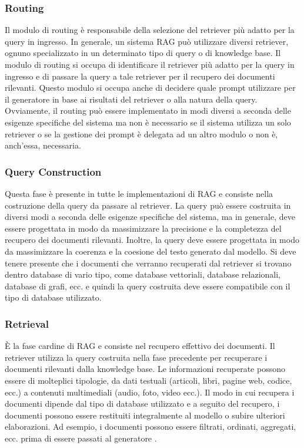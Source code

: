 \subsubsection{Routing}
Il modulo di routing è responsabile della selezione del retriever più adatto per la query in ingresso. In generale, un sistema RAG può utilizzare diversi retriever, ognuno specializzato in un determinato tipo di query o di knowledge base. Il modulo di routing si occupa di identificare il retriever più adatto per la query in ingresso e di passare la query a tale retriever per il recupero dei documenti rilevanti. Questo modulo si occupa anche di decidere quale prompt utilizzare per il generatore in base ai risultati del retriever o alla natura della query. Ovviamente, il routing può essere implementato in modi diversi a seconda delle esigenze specifiche del sistema ma non è necessario se il sistema utilizza un solo retriever o se la gestione dei prompt è delegata ad un altro modulo o non è, anch'essa, necessaria.

\subsubsection{Query Construction}
Questa fase è presente in tutte le implementazioni di RAG e consiste nella costruzione della query da passare al retriever. La query può essere costruita in diversi modi a seconda delle esigenze specifiche del sistema, ma in generale, deve essere progettata in modo da massimizzare la precisione e la completezza del recupero dei documenti rilevanti. Inoltre, la query deve essere progettata in modo da massimizzare la coerenza e la coesione del testo generato dal modello. Si deve tenere presente che i documenti che verranno recuperati dal retriever si trovano dentro database di vario tipo, come database vettoriali, database relazionali, database di grafi, ecc. e quindi la query costruita deve essere compatibile con il tipo di database utilizzato.

\subsubsection{Retrieval}
È la fase cardine di RAG e consiste nel recupero effettivo dei documenti. Il retriever utilizza la query costruita nella fase precedente per recuperare i documenti rilevanti dalla knowledge base. Le informazioni recuperate possono essere di molteplici tipologie, da dati testuali (articoli, libri, pagine web, codice, ecc.) a contenuti multimediali (audio, foto, video ecc.). Il modo in cui recupera i documenti dipende dal tipo di database utilizzato e a seguito del recupero, i documenti possono essere restituiti integralmente al modello o subire ulteriori elaborazioni. Ad esempio, i documenti possono essere filtrati, ordinati, aggregati, ecc. prima di essere passati al generatore \cite{liu2023lostmiddlelanguagemodels}.

